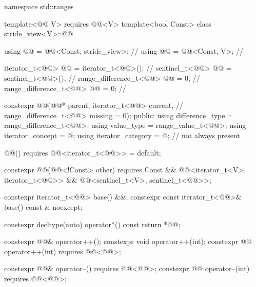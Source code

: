%
\begin{codeblock}
namespace std::ranges {
  template<@@ V>
    requires @@<V>
  template<bool Const>
  class stride_view<V>::@@ {
    using @@ = @@<Const, stride_view>;                      // \expos
    using @@ = @@<Const, V>;                                  // \expos

    iterator_t<@@> @@ = iterator_t<@@>();                      // \expos
    sentinel_t<@@> @@ = sentinel_t<@@>();                          // \expos
    range_difference_t<@@> @@ = 0;                                // \expos
    range_difference_t<@@> @@ = 0;                               // \expos

    constexpr @@(@@* parent, iterator_t<@@> current,        // \expos
                       range_difference_t<@@> missing = 0);
  public:
    using difference_type = range_difference_t<@@>;
    using value_type = range_value_t<@@>;
    using iterator_concept = @\seebelow@;
    using iterator_category = @\seebelow@;    // not always present

    @@() requires @@<iterator_t<@@>> = default;

    constexpr @@(@@<!Const> other)
      requires Const && @@<iterator_t<V>, iterator_t<@@>>
                     && @@<sentinel_t<V>, sentinel_t<@@>>;

    constexpr iterator_t<@@> base() &&;
    constexpr const iterator_t<@@>& base() const & noexcept;

    constexpr decltype(auto) operator*() const { return *@@; }

    constexpr @@& operator++();
    constexpr void operator++(int);
    constexpr @@ operator++(int) requires @@<@@>;

    constexpr @@& operator--() requires @@<@@>;
    constexpr @@ operator--(int) requires @@<@@>;

}}
\end{codeblock}
